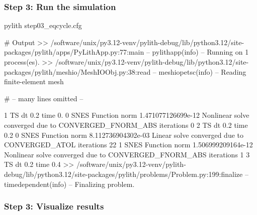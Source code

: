 \documentclass[aspectratio=169]{beamer}
\begin{document}
\begin{frame}[fragile]
  \frametitle{Step 3: Run the simulation}
  \summary{}

\begin{bashcode}
pylith step03_eqcycle.cfg

# Output
 >> /software/unix/py3.12-venv/pylith-debug/lib/python3.12/site-packages/pylith/apps/PyLithApp.py:77:main
 -- pylithapp(info)
 -- Running on 1 process(es).
 >> /software/unix/py3.12-venv/pylith-debug/lib/python3.12/site-packages/pylith/meshio/MeshIOObj.py:38:read
 -- meshiopetsc(info)
 -- Reading finite-element mesh

# -- many lines omitted --

1 TS dt 0.2 time 0.
    0 SNES Function norm 1.471077126699e-12
    Nonlinear solve converged due to CONVERGED_FNORM_ABS iterations 0
2 TS dt 0.2 time 0.2
    0 SNES Function norm 8.112736904302e-03
      Linear solve converged due to CONVERGED_ATOL iterations 22
    1 SNES Function norm 1.506999209164e-12
    Nonlinear solve converged due to CONVERGED_FNORM_ABS iterations 1
3 TS dt 0.2 time 0.4
 >> /software/unix/py3.12-venv/pylith-debug/lib/python3.12/site-packages/pylith/problems/Problem.py:199:finalize
 -- timedependent(info)
 -- Finalizing problem.
\end{bashcode}
  
\end{frame}


\begin{frame}
  \frametitle{Step 3: Visualize results}

    
\end{frame}


\end{document}
